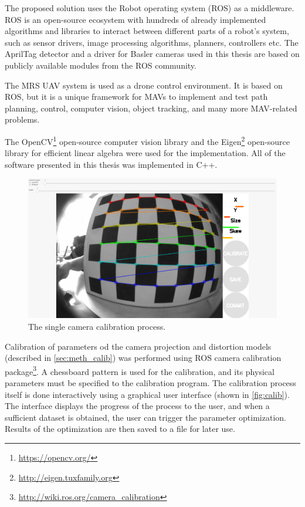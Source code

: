 The proposed solution uses the Robot operating system (ROS) \cite{Rospaper} as a middleware.
ROS is an open-source ecosystem with hundreds of already implemented algorithms and libraries to interact between different parts of a robot's system, such as sensor drivers, image processing algorithms, planners, controllers etc.
The AprilTag detector and a driver for Basler cameras used in this thesis are based on publicly available modules from the ROS community.

The MRS UAV system \cite{Baca2021} is used as a drone control environment. It is based on ROS, but it is a unique framework for MAVs to implement and test path planning, control, computer vision, object tracking, and many more MAV-related problems.

The OpenCV\footnote{\url{https://opencv.org/}} open-source computer vision library and the Eigen\footnote{\url{http://eigen.tuxfamily.org}} open-source library for efficient linear algebra were used for the implementation.
All of the software presented in this thesis was implemented in C++.

\begin{figure}[h]
    \centering
    \includegraphics[width=.6\textwidth]{graphics/calibration.png}
    \caption{The single camera calibration process.}
    \label{fig:calib}
\end{figure}

Calibration of parameters od the camera projection and distortion models (described in \autoref{sec:meth_calib}) was performed using ROS camera calibration package\footnote{\url{http://wiki.ros.org/camera_calibration}}.
A chessboard pattern is used for the calibration, and its physical parameters must be specified to the calibration program.
The calibration process itself is done interactively using a graphical user interface (shown in \autoref{fig:calib}).
The interface displays the progress of the process to the user, and when a sufficient dataset is obtained, the user can trigger the parameter optimization. 
Results of the optimization are then saved to a file for later use.

